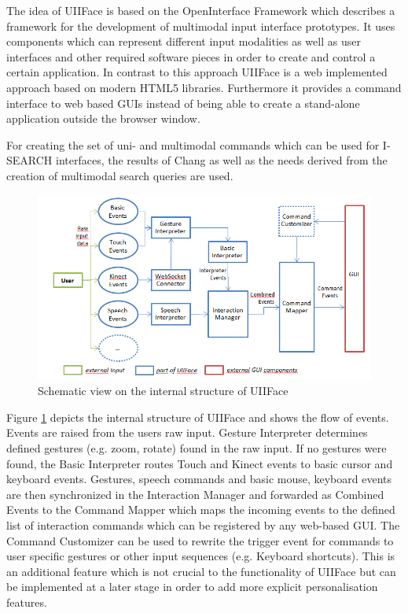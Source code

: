 \documentclass[runningheads,a4paper]{llncs} \usepackage[utf8]{inputenc}
\begin{document}
The idea of UIIFace is based on the OpenInterface Framework \cite{openinterface}
which describes a framework for the development of multimodal input interface
prototypes. It uses components which can represent different input modalities as
well as user interfaces and other required software pieces in order to create
and control a certain application. In contrast to this approach UIIFace is a web
implemented approach based on modern HTML5 libraries. Furthermore it provides a
command interface to web based GUIs instead of being able to create a
stand-alone application outside the browser window.

For creating the set of uni- and multimodal commands which can be used for
\mbox{I-SEARCH} interfaces, the results of Chang \cite{chang} as well as the needs
derived from the creation of multimodal search queries are used.

\begin{figure}[h!]
  \centering
    \includegraphics[width=0.8\linewidth]{resources/uiiface-structure.png}
  \caption{Schematic view on the internal structure of UIIFace}
  \label{fig:uiiface}
\end{figure}

Figure \ref{fig:uiiface} depicts the internal structure of UIIFace and shows the
flow of events. Events are raised from the users raw input. Gesture Interpreter
determines defined gestures (e.g. zoom, rotate) found in the raw input. If no
gestures were found, the Basic Interpreter routes Touch and Kinect events to
basic cursor and keyboard events. Gestures, speech commands and basic mouse,
keyboard events are then synchronized in the Interaction Manager and forwarded
as Combined Events to the Command Mapper which maps the incoming events to the
defined list of interaction commands which can be registered by any web-based
GUI. The Command Customizer can be used to rewrite the trigger event for
commands to user specific gestures or other input sequences (e.g. Keyboard
shortcuts). This is an additional feature which is not crucial to the
functionality of UIIFace but can be implemented at a later stage in order to add
more explicit personalisation features.
\end{document}
